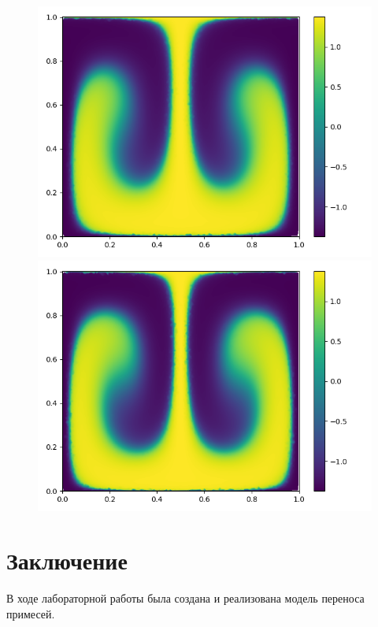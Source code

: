 \documentclass[a4paper, 14pt]{extarticle}
\begin{document}
		\begin{figure}[H]
			\begin{minipage}{0.5\textwidth}
				\centering
				\includegraphics[width = \linewidth]{9.png}
			\end{minipage}\hfill
			\begin{minipage}{0.5\textwidth}
				\centering
				\includegraphics[width = \linewidth]{10.png}
			\end{minipage}\hfill
		\end{figure}
		
	\section{Заключение}
		В ходе лабораторной работы была создана и реализована модель переноса примесей.
\end{document}
